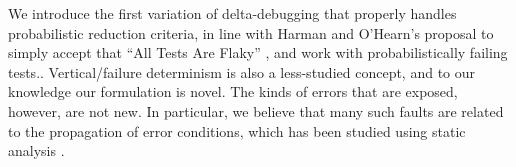 We introduce the first variation of
delta-debugging that properly handles probabilistic reduction criteria, in line with Harman and O'Hearn's proposal to simply accept that ``All Tests Are Flaky'' \cite{StartupstoScaleups}, and work with probabilistically failing tests..
Vertical/failure determinism is also a less-studied concept, and to our knowledge our formulation is novel. The kinds of errors that are exposed, however, are not new.  In particular, we believe that many such faults are related to the propagation of error conditions, which has been studied using static analysis \cite{FileProp}.


\begin{comment}
Finally, Cotroneo et al. \cite{CompBugs,FaultTriggers}, and Grottke and Trivedi \cite{GrottkeBugs} have followed on early work on understanding bugs and how they manifest, including transient \cite{Transient} software faults.  This work informs our attempt to identify sources of nondeterminism, and should provide other, context and project-specific, sources that could be introduced into our general framework.
\end{comment}